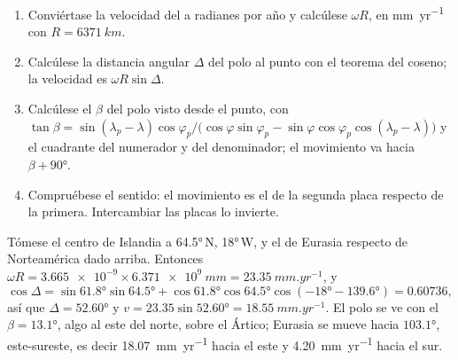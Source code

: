 \begin{method}\label{met:b1:plate-kinematics:velocity}
\begin{enumerate}
  \item Conviértase la velocidad del  a radianes por año y calcúlese
        $\omega R$, en \unit{mm.yr^{-1}} con $R = \qty{6371}{km}$.
  \item Calcúlese la distancia angular $\Delta$ del polo al punto con el teorema del coseno; la velocidad es $\omega R\sin\Delta$.
  \item Calcúlese el  $\beta$ del polo visto desde el punto, con
        $\tan\beta = \sin(\lambda_p - \lambda)\cos\varphi_p /
        \bigl(\cos\varphi\sin\varphi_p - \sin\varphi\cos\varphi_p
        \cos(\lambda_p - \lambda)\bigr)$ y el cuadrante del numerador y
        del denominador; el movimiento va hacia $\beta + \ang{90}$.
  \item Compruébese el sentido: el movimiento es el de la segunda placa respecto de la primera. Intercambiar las placas lo invierte.
\end{enumerate}
\end{method}

\begin{example}\label{ex:b1:plate-kinematics:iceland}
Tómese el centro de Islandia a \ang{64.5}\,N, \ang{18}\,W, y el  de Eurasia respecto de Norteamérica dado arriba.
Entonces $\omega R =
\num{3.665e-9}\times\qty{6.371e9}{mm} = \qty{23.35}{mm.yr^{-1}}$, y
\[
  \cos\Delta = \sin\ang{61.8}\sin\ang{64.5}
  + \cos\ang{61.8}\cos\ang{64.5}\cos(\ang{-18} - \ang{139.6}) = 0.60736,
\]
así que $\Delta = \ang{52.60}$ y $v = 23.35\sin\ang{52.60} = \qty{18.55}{mm.yr^{-1}}$.
El polo se ve con el  $\beta = \ang{13.1}$, algo al este del norte, sobre el Ártico; Eurasia se mueve hacia $\ang{103.1}$, este-sureste, es decir
\qty{18.07}{mm.yr^{-1}} hacia el este y \qty{4.20}{mm.yr^{-1}} hacia el sur.
\end{example}

